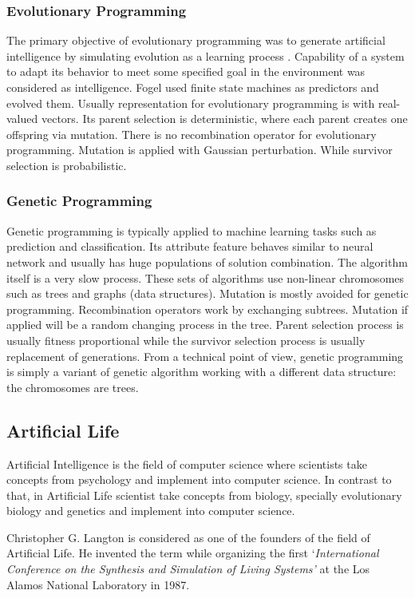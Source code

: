 \documentclass[letterpaper]{article}
\numberwithin{equation}{section}
\begin{document}
\subsubsection{Evolutionary Programming}
The primary objective of evolutionary programming was to generate artificial intelligence by simulating evolution as a learning process \cite{fogel1966}. Capability of a system to adapt its behavior to meet some specified goal in the environment was considered as intelligence. Fogel used finite state machines as predictors and evolved them. Usually representation for evolutionary programming is with real-valued vectors. Its parent selection is deterministic, where each parent creates one offspring via mutation. There is no recombination operator for evolutionary programming. Mutation is applied with Gaussian perturbation. While survivor selection is probabilistic. 

\subsubsection{Genetic Programming}
Genetic programming is typically applied to machine learning tasks such as prediction and classification. Its attribute feature behaves similar to neural network and usually has huge populations of solution combination. The algorithm itself is a very slow process. These sets of algorithms use non-linear chromosomes such as trees and graphs (data structures). Mutation is mostly avoided for genetic programming. Recombination operators work by exchanging subtrees. Mutation if applied will be a random changing process in the tree. Parent selection process is usually fitness proportional while the survivor selection process is usually replacement of generations. From a technical point of view, genetic programming is simply a variant of genetic algorithm working with a different data structure: the chromosomes are trees. 

\subsection{Artificial Life}
Artificial Intelligence is the field of computer science where scientists take concepts from psychology and implement into computer science. In contrast to that, in Artificial Life scientist take concepts from biology, specially evolutionary biology and genetics and implement into computer science. 

Christopher G. Langton is considered as one of the founders of the field of Artificial Life. He invented the term while organizing the first `\textsl{International Conference on the Synthesis and Simulation of Living Systems'} at the Los Alamos National Laboratory in 1987.
\end{document}
